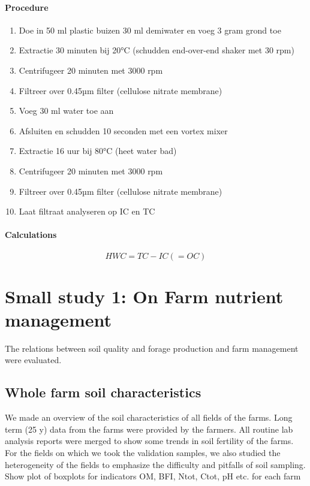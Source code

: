 \documentclass[10pt,twoside,dutch,english]{report}
\begin{document}
\begin{appendices}
\subsubsection{Procedure}
\begin{enumerate}
\item Doe in 50 ml plastic buizen 30 ml demiwater en voeg 3 gram grond toe
\item Extractie 30 minuten bij 20°C (schudden end-over-end shaker met 30 rpm)
\item Centrifugeer 20 minuten met 3000 rpm
\item Filtreer over 0.45µm filter (cellulose nitrate membrane)
\item Voeg 30 ml water toe aan
\item Afsluiten en schudden 10 seconden met een vortex mixer
\item Extractie 16 uur bij 80°C (heet water bad)
\item Centrifugeer 20 minuten met 3000 rpm
\item Filtreer over 0.45µm filter (cellulose nitrate membrane)
\item Laat filtraat analyseren op IC en TC
\end{enumerate}



\subsubsection{Calculations}
\begin{equation} HWC= TC-IC (=OC)
\end{equation}
\chapter{Small study 1: On Farm nutrient management}
		\label{chap: study1}
		The relations between soil quality and forage production and farm management were evaluated. 
			\section{Whole farm soil characteristics}
	We made an overview of the soil characteristics of all fields of the farms. Long term (25 y) data from the farms were provided by the farmers. All routine lab analysis reports were merged to show some trends in  soil fertility of the farms. For the fields on which we took the validation samples, we also studied the heterogeneity of the fields to emphasize the difficulty and pitfalls of soil sampling. 
	Show plot of boxplots for indicators OM, BFI, Ntot, Ctot, pH etc. for each farm
	

\end{appendices}
\end{document}

